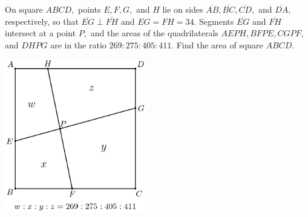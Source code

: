 On square $ABCD,$ points $E,F,G,$ and $H$ lie on sides $\overline{AB},\overline{BC},\overline{CD},$ and $\overline{DA},$ respectively, so that $\overline{EG} \perp \overline{FH}$ and $EG=FH = 34.$ Segments $\overline{EG}$ and $\overline{FH}$ intersect at a point $P,$ and the areas of the quadrilaterals $AEPH, BFPE, CGPF,$ and $DHPG$ are in the ratio $269:275:405:411.$ Find the area of square $ABCD$.


\begin{center}
\includegraphics[width = 61.6mm]{img/fig0.png}
\end{center}